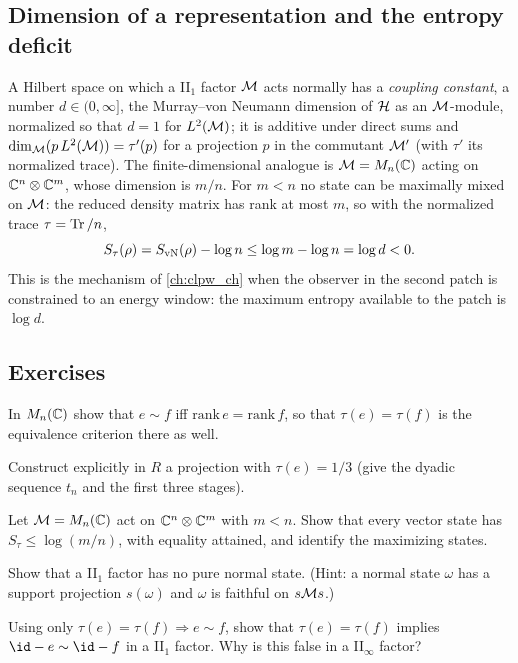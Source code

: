 \subsection{Dimension of a representation and the entropy deficit}
A Hilbert space on which a II$_1$ factor $\mathcal{M}$ acts normally has a \emph{coupling constant}, a number $d\in(0,\infty]$, the Murray--von Neumann dimension of $\mathcal{H}$ as an $\mathcal{M}$-module, normalized so that $d=1$ for $L^2(\mathcal{M})$; it is additive under direct sums and $\dim_{\mathcal{M}}(p\,L^2(\mathcal{M}))=\tau'(p)$ for a projection $p$ in the commutant $\mathcal{M}'$ (with $\tau'$ its normalized trace). The finite-dimensional analogue is $\mathcal{M}=M_n(\mathbb{C})$ acting on $\mathbb{C}^n\otimes\mathbb{C}^m$, whose dimension is $m/n$. For $m<n$ no state can be maximally mixed on $\mathcal{M}$: the reduced density matrix has rank at most $m$, so with the normalized trace $\tau=\operatorname{Tr}/n$,
\begin{equation}
S_\tau(\rho)=S_{\rm vN}(\rho)-\log n\le\log m-\log n=\log d<0.
\end{equation}
This is the mechanism of \cref{ch:clpw_ch} when the observer in the second patch is constrained to an energy window: the maximum entropy available to the patch is $\log d$.

\subsection*{Exercises}
\begin{exercise}\label{ex:dimension:1}
In $M_n(\mathbb{C})$ show that $e\sim f$ iff $\mathrm{rank}\,e=\mathrm{rank}\,f$, so that $\tau(e)=\tau(f)$ is the equivalence criterion there as well.
\end{exercise}
\begin{exercise}\label{ex:dimension:2}
Construct explicitly in $R$ a projection with $\tau(e)=1/3$ (give the dyadic sequence $t_n$ and the first three stages).
\end{exercise}
\begin{exercise}\label{ex:dimension:3}
Let $\mathcal{M}=M_n(\mathbb{C})$ act on $\mathbb{C}^n\otimes\mathbb{C}^m$ with $m<n$. Show that every vector state has $S_\tau\le\log(m/n)$, with equality attained, and identify the maximizing states.
\end{exercise}
\begin{exercise}\label{ex:dimension:4}
Show that a II$_1$ factor has no pure normal state. (Hint: a normal state $\omega$ has a support projection $s(\omega)$ and $\omega$ is faithful on $s\mathcal{M} s$.)
\end{exercise}
\begin{exercise}\label{ex:dimension:5}
Using only $\tau(e)=\tau(f)\Rightarrow e\sim f$, show that $\tau(e)=\tau(f)$ implies $\id-e\sim\id-f$ in a II$_1$ factor. Why is this false in a II$_\infty$ factor?
\end{exercise}
